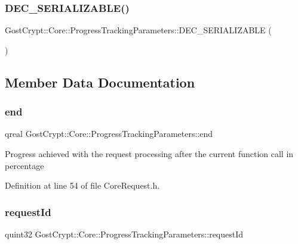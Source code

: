 \subsubsection{\texorpdfstring{D\+E\+C\+\_\+\+S\+E\+R\+I\+A\+L\+I\+Z\+A\+B\+L\+E()}{DEC\_SERIALIZABLE()}}
{\footnotesize\ttfamily Gost\+Crypt\+::\+Core\+::\+Progress\+Tracking\+Parameters\+::\+D\+E\+C\+\_\+\+S\+E\+R\+I\+A\+L\+I\+Z\+A\+B\+LE (\begin{DoxyParamCaption}\item[{\hyperlink{struct_gost_crypt_1_1_core_1_1_progress_tracking_parameters}{Progress\+Tracking\+Parameters}}]{ }\end{DoxyParamCaption})}



\subsection{Member Data Documentation}
\mbox{\label{struct_gost_crypt_1_1_core_1_1_progress_tracking_parameters_aa2da7bedf0c93464cc41f268c3977a5d}} 
\subsubsection{\texorpdfstring{end}{end}}
{\footnotesize\ttfamily qreal Gost\+Crypt\+::\+Core\+::\+Progress\+Tracking\+Parameters\+::end}

Progress achieved with the request processing after the current function call in percentage 

Definition at line 54 of file Core\+Request.\+h.

\mbox{\label{struct_gost_crypt_1_1_core_1_1_progress_tracking_parameters_a4359b9c9116512f80f119936da069a80}} 
\subsubsection{\texorpdfstring{request\+Id}{requestId}}
{\footnotesize\ttfamily quint32 Gost\+Crypt\+::\+Core\+::\+Progress\+Tracking\+Parameters\+::request\+Id}

